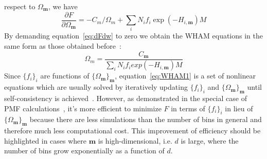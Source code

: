 respect to $\Omega_{\mathbf{m}}$, we have
\begin{equation}
\frac{\partial F}{\partial \Omega_{\mathbf{m}}} = -C_{m}/\Omega_{m} + \sum_{i}^{} N_{i} f_{i} \exp(-H_{i,\mathbf{m}}) M
\label{eq:dFdw}
\end{equation}
By demanding equation~\ref{eq:dFdw} to zero we obtain the WHAM equations in the same form 
as those obtained before~\cite{Zhu2012,Chodera2007,Kumar1992}:
\begin{equation}
\Omega_{m} = \frac{C_{\mathbf{m}}}{\sum\limits_{i}^{} N_{i} f_{i} exp(-H_{i,\mathbf{m}}) M}
\label{eq:WHAM1}
\end{equation}
Since $\{f_{i}\}_{i}$ are functions of $\{\Omega_{\mathbf{m}}\}_{\mathbf{m}}$, equation~\ref{eq:WHAM1}
is a set of nonlinear equations which are usually solved by iteratively updating 
$\{f_{i}\}_{i}$ and $\{\Omega_{\mathbf{m}}\}_{\mathbf{m}}$ until self-consistency is 
achieved~\cite{Kumar1992,wham205}. However, as demonstrated in the special case of PMF 
calculations~\cite{Zhu2012}, it's more efficient to minimize $F$ in terms of $\{f_{i}\}_{i}$ 
in lieu of $\{\Omega_{\mathbf{m}}\}_{\mathbf{m}}$ because there are less simulations than 
the number of bins in general and therefore much less computational cost. This improvement of 
efficiency should be highlighted in cases where $\mathbf{m}$ is high-dimensional, i.e. $d$ is 
large, where the number of bins grow exponentially as a function of $d$.

